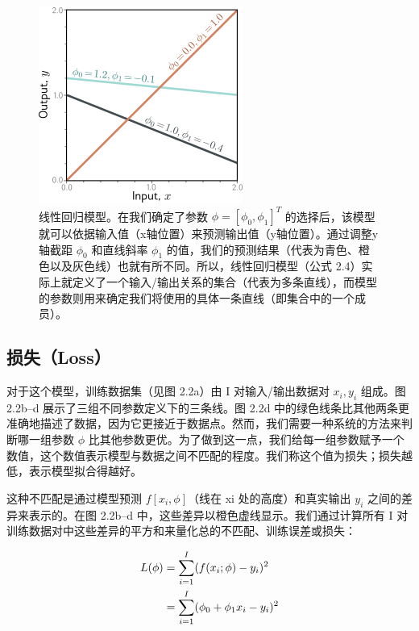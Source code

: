 \begin{figure}
	\centering
	\includegraphics[width=0.7\linewidth]{png/chapter2/SupervisedLinear}
	\caption{线性回归模型。在我们确定了参数 $\phi = [\phi_0 , \phi_1 ]^T$ 的选择后，该模型就可以依据输入值（x轴位置）来预测输出值（y轴位置）。通过调整y轴截距 $\phi_0$ 和直线斜率 $\phi_1$ 的值，我们的预测结果（代表为青色、橙色以及灰色线）也就有所不同。所以，线性回归模型（公式 2.4）实际上就定义了一个输入/输出关系的集合（代表为多条直线），而模型的参数则用来确定我们将使用的具体一条直线（即集合中的一个成员）。}
\end{figure}


\subsection{损失（Loss）}

对于这个模型，训练数据集（见图 2.2a）由 I 对输入/输出数据对 ${x_i, y_i}$ 组成。图 2.2b–d 展示了三组不同参数定义下的三条线。图 2.2d 中的绿色线条比其他两条更准确地描述了数据，因为它更接近于数据点。然而，我们需要一种系统的方法来判断哪一组参数 $\phi$ 比其他参数更优。为了做到这一点，我们给每一组参数赋予一个数值，这个数值表示模型与数据之间不匹配的程度。我们称这个值为损失；损失越低，表示模型拟合得越好。

这种不匹配是通过模型预测 $f[x_i,\phi]$（线在 xi 处的高度）和真实输出 $y_i$ 之间的差异来表示的。在图 2.2b–d 中，这些差异以橙色虚线显示。我们通过计算所有 I 对训练数据对中这些差异的平方和来量化总的不匹配、训练误差或损失：

\begin{align}
	L(\phi) &= \sum_{i=1}^{I} (f(x_i; \phi) - y_i)^2  \notag \\
	&= \sum_{i=1}^{I} (\phi_0 + \phi_1 x_i - y_i)^2 
\end{align}


